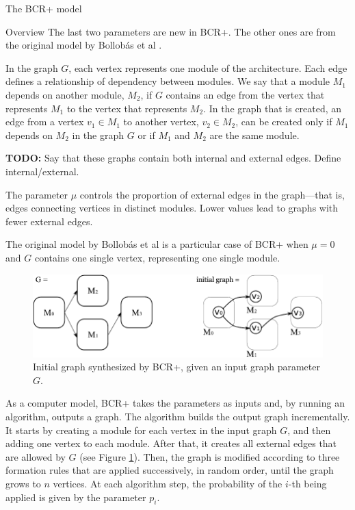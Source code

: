 \documentclass[11pt,twocolumn,a4paper,english]{article}
\newcommand{\TODO}{\textbf{TODO:} }
\begin{document}
\begin{section}{The BCR+ model}
\begin{subsection}{Overview}
	The last two parameters are new in BCR+. The other ones are from the original model by Bollobás et al \cite{Bollobas2003}.
	
	In the graph $G$, each vertex represents one module of the architecture. Each edge defines a relationship of dependency between modules. We say that a module $M_1$ depends on another module, $M_2$, if $G$ contains an edge from the vertex that represents $M_1$ to the vertex that represents $M_2$. In the graph that is created, an edge from a vertex $v_1 \in M_1$ to another vertex, $v_2 \in M_2$, can be created only if $M_1$ depends on $M_2$ in the graph $G$ or if $M_1$ and $M_2$ are the same module.
	
		\TODO Say that these graphs contain both internal and external edges. Define internal/external.
		
	The parameter $\mu$ controls the proportion of external edges in the graph---that is, edges connecting vertices in distinct modules. Lower values lead to graphs with fewer external edges.
	
	The original model by Bollobás et al \cite{Bollobas2003} is a particular case of BCR+ when $\mu = 0$ and $G$ contains one single vertex, representing one single module.
	

\begin{figure}[htbp]
	\centering
		\includegraphics[scale=1]{figures/bcr-initial-graph}
	\caption{Initial graph synthesized by BCR+, given an input graph parameter $G$.}
	\label{fig:bcr-initial-graph}
\end{figure}
	
	As a computer model, BCR+ takes the parameters as inputs and, by running an algorithm, outputs a graph. The algorithm builds the output graph incrementally. It starts by creating a module for each vertex in the input graph $G$, and then adding one vertex to each module. After that, it creates all external edges that are allowed by $G$ (see Figure \ref{fig:bcr-initial-graph}). Then, the graph is modified according to three formation rules that are applied successively, in random order, until the graph grows to $n$ vertices. At each algorithm step, the probability of the $i$-th being applied is given by the parameter $p_i$.


\end{subsection}
\end{section}
\end{document}
